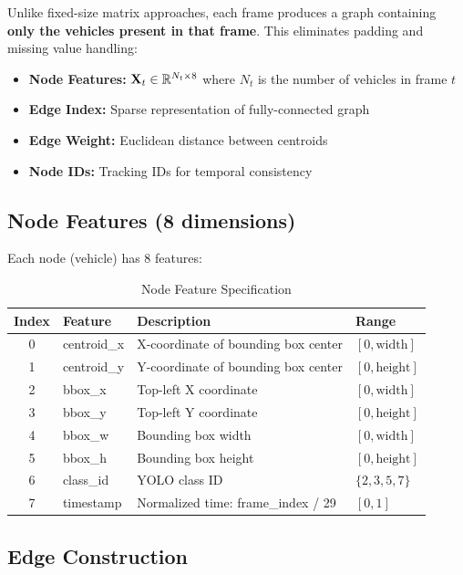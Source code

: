 Unlike fixed-size matrix approaches, each frame produces a graph containing \textbf{only the vehicles present in that frame}. This eliminates padding and missing value handling:

\begin{itemize}
    \item \textbf{Node Features:} $\mathbf{X}_t \in \mathbb{R}^{N_t \times 8}$ where $N_t$ is the number of vehicles in frame $t$
    \item \textbf{Edge Index:} Sparse representation of fully-connected graph
    \item \textbf{Edge Weight:} Euclidean distance between centroids
    \item \textbf{Node IDs:} Tracking IDs for temporal consistency
\end{itemize}

\subsection{Node Features (8 dimensions)}

Each node (vehicle) has 8 features:

\begin{table}[H]
\centering
\caption{Node Feature Specification}
\label{tab:node_features}
\begin{tabular}{clll}
\toprule
\textbf{Index} & \textbf{Feature} & \textbf{Description} & \textbf{Range} \\
\midrule
0 & centroid\_x & X-coordinate of bounding box center & $[0, \text{width}]$ \\
1 & centroid\_y & Y-coordinate of bounding box center & $[0, \text{height}]$ \\
2 & bbox\_x & Top-left X coordinate & $[0, \text{width}]$ \\
3 & bbox\_y & Top-left Y coordinate & $[0, \text{height}]$ \\
4 & bbox\_w & Bounding box width & $[0, \text{width}]$ \\
5 & bbox\_h & Bounding box height & $[0, \text{height}]$ \\
6 & class\_id & YOLO class ID & $\{2, 3, 5, 7\}$ \\
7 & timestamp & Normalized time: frame\_index / 29 & $[0, 1]$ \\
\bottomrule
\end{tabular}
\end{table}



\subsection{Edge Construction}

